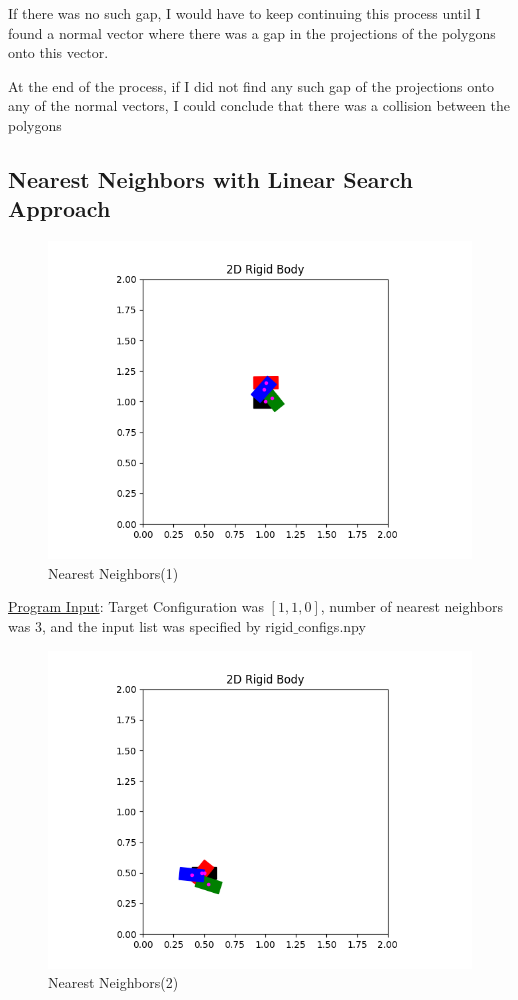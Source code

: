 \documentclass{article}
\begin{document}
If there was no such gap, I would have to keep continuing this process until I found a normal vector where there was a gap in the projections of the polygons onto this vector. 

At the end of the process, if I did not find any such gap of the projections onto any of the normal vectors, I could conclude that there was a collision between the polygons 

\newpage 
\subsection{Nearest Neighbors with Linear Search Approach}
\begin{figure}[h!]
	\includegraphics[width= 0.9 \linewidth]{P2_NearestNeighbor(1).png}
	\centering
	\caption{Nearest Neighbors(1)}
	\label{P2_NearestNeighbor(1).png}
\end{figure}

\underline{Program Input}: Target Configuration was $[1, 1, 0]$, number of nearest neighbors was 3, and the input list was specified by rigid$\_$configs.npy
\newpage 
\begin{figure}[h!]
	\includegraphics[width= 0.9 \linewidth]{P2_NearestNeighbor(2).png}
	\centering
	\caption{Nearest Neighbors(2)}
	\label{P2_NearestNeighbor(2).png}
\end{figure}
\end{document}
